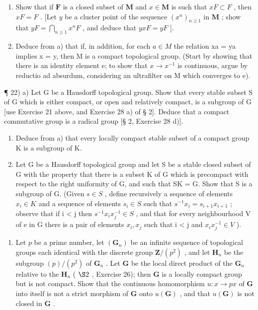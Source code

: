 \begin{enumerate}
\def\labelenumi{\alph{enumi})}
\item
  Show that if \(\mathbf{F}\) is a closed subset of \(\mathbf{M}\) and \(x \in \mathbf{M}\) is such that \(xF \subset F\) , then \(xF = F\) . {[}Let \(y\) be a cluster point of the sequence \((x^n)_{n \geqslant 1}\) in \(\mathbf{M}\) ; show that \(yF = \bigcap_{n \geqslant 1} x^n F\) , and deduce that \(yxF = yF\) {]}.
\item
  Deduce from a) that if, in addition, for each \(a \in M\) the relation xa = ya implies x = y, then M is a compact topological group. (Start by showing that there is an identity element e; to show that \(x \to x^{-1}\) is continuous, argue by reductio ad absurdum, considering an ultrafilter on M which converges to e).
\end{enumerate}

¶ 22) a) Let G be a Hausdorff topological group. Show that every stable subset S of G which is either compact, or open and relatively compact, is a subgroup of G {[}use Exercise 21 above, and Exercise 28 a) of § 2{]}. Deduce that a compact commutative group is a radical group {[}§ 2, Exercise 28 d){]}.

\begin{enumerate}
\def\labelenumi{\alph{enumi})}
\setcounter{enumi}{1}
\item
  Deduce from a) that every locally compact stable subset of a compact group K is a subgroup of K.
\item
  Let G be a Hausdorff topological group and let S be a stable closed subset of G with the property that there is a subset K of G which is precompact with respect to the right uniformity of G, and such that SK = G. Show that S is a subgroup of G. (Given \(s \in S\) , define recursively a sequence of elements \(x_{i} \in K\) and a sequence of elements \(s_{i} \in S\) such that \(s^{-1}x_{i} = s_{i+1}x_{i+1}\) ; observe that if i \textless{} j then \(s^{-1}x_{i}x^{-1}_{j} \in S\) , and that for every neighbourhood V of e in G there is a pair of elements \(x_{i}, x_{j}\) such that i \textless{} j and \(x_{i}x^{-1}_{j} \in V\) ).
\end{enumerate}

\begin{enumerate}
\def\labelenumi{\arabic{enumi})}
\setcounter{enumi}{22}
\tightlist
\item
  Let \(p\) be a prime number, let \((\mathbf{G}_n)\) be an infinite sequence of topological groups each identical with the discrete group \(\mathbf{Z}/(p^2)\) , and let \(\mathbf{H}_n\) be the subgroup \((p) / (p^2)\) of \(\mathbf{G}_n\) . Let \(\mathbf{G}\) be the local direct product of the \(\mathbf{G}_n\) relative to the \(\mathbf{H}_n\) ( \(\S 2\) , Exercise 26); then \(\mathbf{G}\) is a locally compact group but is not compact. Show that the continuous homomorphism \(u: x \to px\) of \(\mathbf{G}\) into itself is not a strict morphism of \(\mathbf{G}\) onto \(u(\mathbf{G})\) , and that \(u(\mathbf{G})\) is not closed in \(\mathbf{G}\) .
\end{enumerate}
